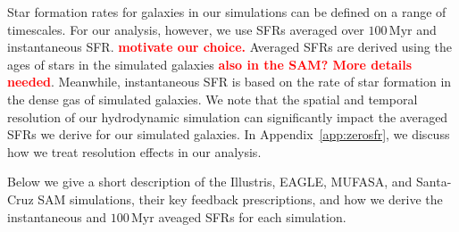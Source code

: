 \documentclass[preprint2,tighten]{aastex62}
\newcommand{\todo}[1]{{\bf \textcolor{red}{ #1}}}
\begin{document}
Star formation rates for galaxies in our simulations can be defined on 
a range of timescales. For our analysis, however, we use SFRs averaged 
over $100\,\mathrm{Myr}$ and instantaneous SFR. \todo{motivate our choice.}
Averaged SFRs are derived using the ages of stars in the simulated 
galaxies \todo{also in the SAM? More details needed}. Meanwhile, instantaneous SFR is based on 
the rate of star formation in the dense gas of simulated galaxies. 
We note that the spatial and temporal resolution of our hydrodynamic 
simulation can significantly impact the averaged SFRs we derive for our 
simulated galaxies. In Appendix~\ref{app:zerosfr}, we discuss how we treat
resolution effects in our analysis. 

Below we give a short description of the Illustris, EAGLE, MUFASA, and 
Santa-Cruz SAM simulations, their key feedback prescriptions, and how 
we derive the instantaneous and $100\,\mathrm{Myr}$ aveaged SFRs for 
each simulation.


\end{document}
